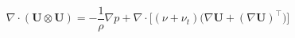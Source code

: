 \documentclass[11pt]{article}
\begin{document}
\begin{equation*}
\nabla \cdot (\mathbf{U} \otimes \mathbf{U}) = -\frac{1}{\rho}\nabla p + \nabla \cdot \bigl[(\nu + \nu_t)\bigl(\nabla \mathbf{U} + (\nabla \mathbf{U})^\top\bigr)\bigr]\tag{3}
\end{equation*}
\end{document}
